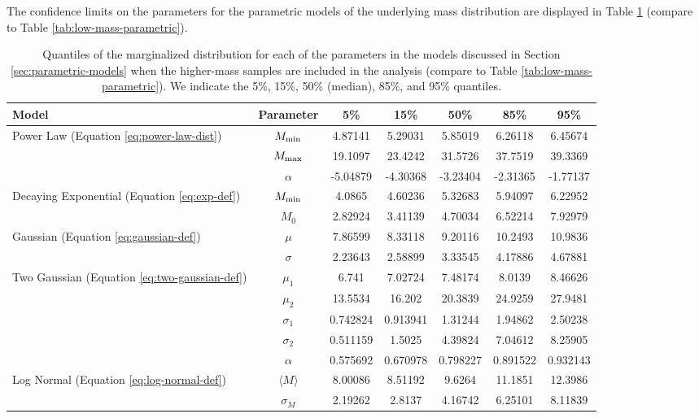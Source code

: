 \documentclass[preprint]{aastex}
\newcommand{\Mmin}{M_{\textnormal{min}}}
\newcommand{\Mmax}{M_{\textnormal{max}}}
\begin{document}
The confidence limits on the parameters for the parametric models of
the underlying mass distribution are displayed in Table
\ref{tab:high-mass-parametric} (compare to Table
\ref{tab:low-mass-parametric}).

\begin{table}
  \begin{center}
    \begin{tabular}{|l|c|c|c|c|c|c|}
      \hline
      Model & Parameter & 5\% & 15\% & 50\% & 85\% & 95\% \\
      \hline \hline
      Power Law (Equation \eqref{eq:power-law-dist}) & $\Mmin$ & 
      4.87141 & 5.29031 & 5.85019 & 6.26118 & 6.45674 \\
      \hline
      & $\Mmax$ & 19.1097 & 23.4242 & 31.5726 & 37.7519 & 39.3369 \\
      \hline
      & $\alpha$ & -5.04879 & -4.30368 & -3.23404 & -2.31365 & -1.77137 \\
      \hline \hline
      Decaying Exponential (Equation \eqref{eq:exp-def}) & $\Mmin$ & 
      4.0865 & 4.60236 & 5.32683 & 5.94097 & 6.22952 \\
      \hline
      & $M_0$ & 2.82924 & 3.41139 & 4.70034 & 6.52214 & 7.92979 \\
      \hline \hline
      Gaussian (Equation \eqref{eq:gaussian-def}) & $\mu$ & 
      7.86599 & 8.33118 & 9.20116 & 10.2493 & 10.9836 \\
      \hline
      & $\sigma$ & 2.23643 & 2.58899 & 3.33545 & 4.17886 & 4.67881 \\
      \hline \hline
      Two Gaussian (Equation \eqref{eq:two-gaussian-def}) & $\mu_1$ & 
      6.741 & 7.02724 & 7.48174 & 8.0139 & 8.46626 \\
      \hline
      & $\mu_2$ & 13.5534 & 16.202 & 20.3839 & 24.9259 & 27.9481 \\
      \hline
      & $\sigma_1$ & 0.742824 & 0.913941 & 1.31244 & 1.94862 & 2.50238 \\
      \hline
      & $\sigma_2$ & 0.511159 & 1.5025 & 4.39824 & 7.04612 & 8.25905 \\
      \hline
      & $\alpha$ & 0.575692 & 0.670978 & 0.798227 & 0.891522 & 0.932143 \\
      \hline \hline
      Log Normal (Equation \eqref{eq:log-normal-def}) & $\langle M \rangle$ & 
      8.00086 & 8.51192 & 9.6264 & 11.1851 & 12.3986 \\
      \hline
      & $\sigma_M$ & 2.19262 & 2.8137 & 4.16742 & 6.25101 & 8.11839 \\
      \hline
    \end{tabular}
  \end{center}
  \caption{\label{tab:high-mass-parametric} Quantiles of the
    marginalized distribution for each of the parameters in the models
    discussed in Section \ref{sec:parametric-models} when the
    higher-mass samples are included in the analysis (compare to Table
    \ref{tab:low-mass-parametric}).  We indicate the 5\%, 15\%, 50\% (median), 85\%, and 95\% quantiles.}
\end{table}
\end{document}
